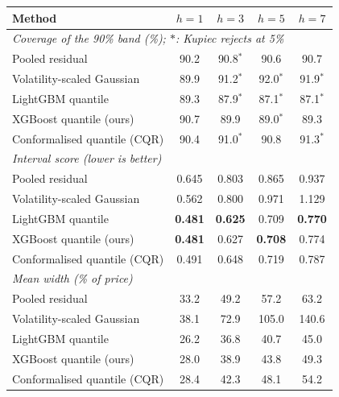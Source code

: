 \begin{tabular}{lcccc}
\toprule
Method & $h{=}1$ & $h{=}3$ & $h{=}5$ & $h{=}7$\\
\midrule
\multicolumn{5}{l}{\emph{Coverage of the 90\% band (\%); $\ast$: Kupiec rejects at 5\%}}\\
Pooled residual & 90.2 & 90.8$^{\ast}$ & 90.6 & 90.7\\
Volatility-scaled Gaussian & 89.9 & 91.2$^{\ast}$ & 92.0$^{\ast}$ & 91.9$^{\ast}$\\
LightGBM quantile & 89.3 & 87.9$^{\ast}$ & 87.1$^{\ast}$ & 87.1$^{\ast}$\\
XGBoost quantile (ours) & 90.7 & 89.9 & 89.0$^{\ast}$ & 89.3\\
Conformalised quantile (CQR) & 90.4 & 91.0$^{\ast}$ & 90.8 & 91.3$^{\ast}$\\
\multicolumn{5}{l}{\emph{Interval score (lower is better)}}\\
Pooled residual & 0.645 & 0.803 & 0.865 & 0.937\\
Volatility-scaled Gaussian & 0.562 & 0.800 & 0.971 & 1.129\\
LightGBM quantile & \textbf{0.481} & \textbf{0.625} & 0.709 & \textbf{0.770}\\
XGBoost quantile (ours) & \textbf{0.481} & 0.627 & \textbf{0.708} & 0.774\\
Conformalised quantile (CQR) & 0.491 & 0.648 & 0.719 & 0.787\\
\multicolumn{5}{l}{\emph{Mean width (\% of price)}}\\
Pooled residual & 33.2 & 49.2 & 57.2 & 63.2\\
Volatility-scaled Gaussian & 38.1 & 72.9 & 105.0 & 140.6\\
LightGBM quantile & 26.2 & 36.8 & 40.7 & 45.0\\
XGBoost quantile (ours) & 28.0 & 38.9 & 43.8 & 49.3\\
Conformalised quantile (CQR) & 28.4 & 42.3 & 48.1 & 54.2\\
\bottomrule
\end{tabular}
